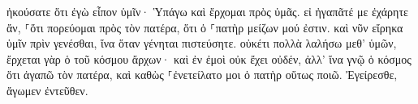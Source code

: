 \documentclass{openreader}
\begin{document}
ἠκούσατε ὅτι ἐγὼ εἶπον ὑμῖν· Ὑπάγω καὶ ἔρχομαι πρὸς ὑμᾶς. εἰ ἠγαπᾶτέ με ἐχάρητε ἄν, ⸀ὅτι πορεύομαι πρὸς τὸν πατέρα, ὅτι ὁ ⸀πατὴρ μείζων μού ἐστιν. 
καὶ νῦν εἴρηκα ὑμῖν πρὶν γενέσθαι, ἵνα ὅταν γένηται πιστεύσητε. 
οὐκέτι πολλὰ λαλήσω μεθ’ ὑμῶν, ἔρχεται γὰρ ὁ τοῦ κόσμου ἄρχων· καὶ ἐν ἐμοὶ οὐκ ἔχει οὐδέν, 
ἀλλ’ ἵνα γνῷ ὁ κόσμος ὅτι ἀγαπῶ τὸν πατέρα, καὶ καθὼς ⸀ἐνετείλατο μοι ὁ πατὴρ οὕτως ποιῶ. Ἐγείρεσθε, ἄγωμεν ἐντεῦθεν. 
\end{document}
